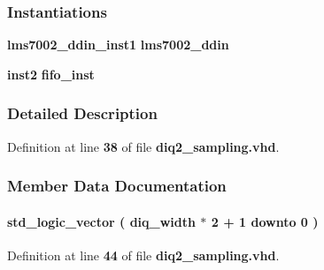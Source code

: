 \subsubsection*{Instantiations}
 \begin{DoxyCompactItemize}
\item 
{\bf lms7002\+\_\+ddin\+\_\+inst1}  {\bfseries lms7002\+\_\+ddin}   
\item 
{\bf inst2}  {\bfseries fifo\+\_\+inst}   
\end{DoxyCompactItemize}


\subsubsection{Detailed Description}


Definition at line {\bf 38} of file {\bf diq2\+\_\+sampling.\+vhd}.



\subsubsection{Member Data Documentation}
\paragraph[{dddin\+\_\+data}]{ {\bfseries \textcolor{comment}{std\+\_\+logic\+\_\+vector}\textcolor{vhdlchar}{ }\textcolor{vhdlchar}{(}\textcolor{vhdlchar}{ }\textcolor{vhdlchar}{ }\textcolor{vhdlchar}{ }\textcolor{vhdlchar}{ }{\bfseries {\bf diq\+\_\+width}} \textcolor{vhdlchar}{$\ast$}\textcolor{vhdlchar}{ } \textcolor{vhdldigit}{2} \textcolor{vhdlchar}{+}\textcolor{vhdlchar}{ } \textcolor{vhdldigit}{1} \textcolor{vhdlchar}{ }\textcolor{keywordflow}{downto}\textcolor{vhdlchar}{ }\textcolor{vhdlchar}{ } \textcolor{vhdldigit}{0} \textcolor{vhdlchar}{ }\textcolor{vhdlchar}{)}\textcolor{vhdlchar}{ }} \hspace{0.3cm}{\ttfamily [Signal]}}\label{classdiq2__sampling_1_1arch_a1be603d0cf3d718ac149b57fe250af75}


Definition at line {\bf 44} of file {\bf diq2\+\_\+sampling.\+vhd}.

